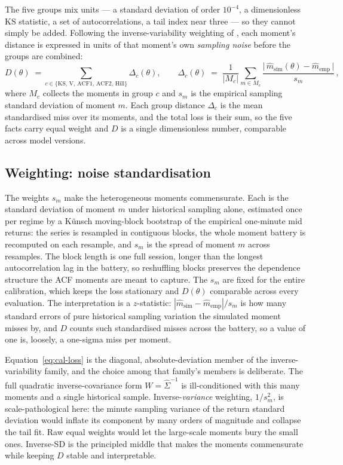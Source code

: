 The five groups mix units --- a standard deviation of order $10^{-4}$, a
dimensionless KS statistic, a set of autocorrelations, a tail index near three
--- so they cannot simply be added. Following the inverse-variability weighting
of \citet{franke_westerhoff_2012}, each moment's distance is expressed in units
of that moment's own \emph{sampling noise} before the groups are combined:
\begin{equation}
\label{eq:cal-loss}
D(\theta)
\;=\!\!\sum_{c \in \{\mathrm{KS,\,V,\,ACF1,\,ACF2,\,Hill}\}}\!\! \Delta_c(\theta),
\qquad
\Delta_c(\theta)
\;=\; \frac{1}{|M_c|}\sum_{m \in M_c}
\frac{\bigl|\,\widehat m_{\mathrm{sim}}(\theta) - \widehat m_{\mathrm{emp}}\,\bigr|}{s_m}\,,
\end{equation}
where $M_c$ collects the moments in group $c$ and $s_m$ is the empirical
sampling standard deviation of moment $m$. Each group distance $\Delta_c$ is the
mean standardised miss over its moments, and the total loss is their sum, so the
five facts carry equal weight and $D$ is a single dimensionless number,
comparable across model versions.

\subsection{Weighting: noise standardisation}
\label{sec:cal-weight}

The weights $s_m$ make the heterogeneous moments commensurate. Each is the
standard deviation of moment $m$ under historical sampling alone, estimated once
per regime by a Künsch moving-block bootstrap \citep{kunsch_1989} of the
empirical one-minute mid returns: the series is resampled in contiguous blocks,
the whole moment battery is recomputed on each resample, and $s_m$ is the spread
of moment $m$ across resamples. The block length is one full session, longer
than the longest autocorrelation lag in the battery, so reshuffling blocks
preserves the dependence structure the ACF moments are meant to capture. The
$s_m$ are fixed for the entire calibration, which keeps the loss stationary and
$D(\theta)$ comparable across every evaluation. The interpretation is a
$z$-statistic: $|\widehat m_{\mathrm{sim}} - \widehat m_{\mathrm{emp}}|/s_m$ is
how many standard errors of pure historical sampling variation the simulated
moment misses by, and $D$ counts such standardised misses across the battery, so
a value of one is, loosely, a one-sigma miss per moment.

Equation~\eqref{eq:cal-loss} is the diagonal, absolute-deviation member of the
\citet{franke_westerhoff_2012} inverse-variability family, and the choice among
that family's members is deliberate. The full quadratic inverse-covariance form
$W=\widehat\Sigma^{-1}$ is ill-conditioned with this many moments and a single
historical sample. Inverse-\emph{variance} weighting, $1/s_m^2$, is
scale-pathological here: the minute sampling variance of the return standard
deviation would inflate its component by many orders of magnitude and collapse
the tail fit. Raw equal weights would let the large-scale moments bury the small
ones. Inverse-SD is the principled middle that makes the moments commensurate
while keeping $D$ stable and interpretable.

